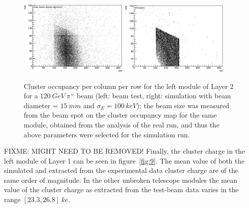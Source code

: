 \documentclass[a4paper,11pt]{article}
\begin{document}
\begin{figure}[htbp]
	\centering %
	\includegraphics[width=0.47\textwidth,origin=c,angle=0]{Cluster_occupancy_per_col_per_row_for_left_module_of_Layer_2.eps}
	\qquad
	\includegraphics[width=0.47\textwidth,origin=c,angle=0]{Cluster_occupancy_left_layer_2_simulation.eps}
	\caption{\label{fig:8} Cluster occupancy per column per row for the left module of Layer 2 for a $120\: GeV\: \pi^{+}$ beam (left: beam test, right: simulation with beam diameter = $15\: mm$ and $\sigma_{E} = 100\: keV$); the beam size was measured from the beam spot on the cluster occupancy map for the same module, obtained from the analysis of the real run, and thus the above parameters were selected for the simulation run.}
\end{figure}

FIXME: MIGHT NEED TO BE REMOVED! Finally, the cluster charge in the left module of Layer 1 can be seen in figure~\ref{fig:9}. The mean value of both the simulated and extracted from the experimental data cluster charge are of the same order of magnitude. In the other unbroken telescope modules the mean value of the cluster charge as extracted from the test-beam data varies in the range $[23.3, 26.8]\: ke$.
\end{document}
